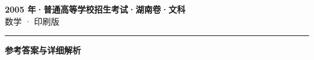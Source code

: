 \documentclass[zihao=5, a4paper]{ctexart}
\begin{document}
\begin{center}
  {\Large\bfseries 2005 年·普通高等学校招生考试·湖南卷·文科}\\[4pt]
  {\large 数学 · 印刷版}
\end{center}
\medskip
{}

\par\bigskip\hrule\bigskip
{}
\begin{center}{\large\bfseries 参考答案与详细解析}\end{center}
\smallskip

\end{document}
